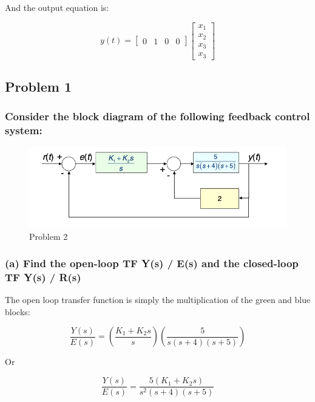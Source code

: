 \documentclass[12pt, letterpaper]{../assignment}
\begin{document}
And the output equation is:

\begin{answer}
    \begin{equation*}
        y(t)=
        \begin{bmatrix}
            0 & 1 & 0 & 0
        \end{bmatrix}
        \begin{bmatrix}
            x_1\\ x_2\\ x_3\\ x_3
        \end{bmatrix}
    \end{equation*}
\end{answer}


\subsection*{Problem 1}
\subsubsection*{Consider the block diagram of the following feedback control system:}


\begin{figure}[H]
    \centering
    \includegraphics[scale=1]{figures/problem2.png}
    \caption{Problem 2}
    \label{Fig:prob2}
\end{figure}

\subsubsection*{(a) Find the open-loop TF Y(s) / E(s) and the closed-loop TF Y(s) / R(s)}

The open loop transfer function is simply the multiplication of the green and blue blocks:

$$ \frac{Y(s)}{E(s)} = \left(\frac{K_1 + K_2 s}{s}\right) \left(\frac{5}{s(s+4)(s+5)}\right) $$

Or
\begin{answer}
    $$ \frac{Y(s)}{E(s)} = \frac{5(K_1 + K_2 s)}{s^2(s+4)(s+5)} $$
\end{answer}
\end{document}
